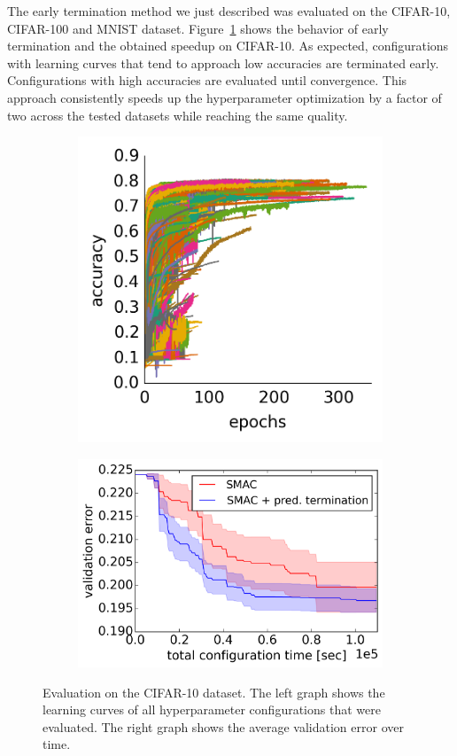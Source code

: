 The early termination method we just described was evaluated on the CIFAR-10, CIFAR-100 and MNIST dataset.
Figure~\ref{fig:earlyterm:eval} shows the behavior of early termination and the obtained speedup on CIFAR-10.
As expected, configurations with learning curves that tend to approach low accuracies are terminated early.
Configurations with high accuracies are evaluated until convergence.
This approach consistently speeds up the hyperparameter optimization by a factor of two across the tested datasets while reaching the same quality.
\begin{figure}
	\begin{subfigure}{0.4\textwidth}
		\centering
		\includegraphics[width=0.9\linewidth]{gfx/earlyterm/samples.png}
	\end{subfigure}
	\begin{subfigure}{0.6\textwidth}
		\centering
		\includegraphics[width=0.8\linewidth]{gfx/earlyterm/time.png}
	\end{subfigure}
	\caption{
		Evaluation on the CIFAR-10 dataset.
		The left graph shows the learning curves of all hyperparameter configurations that were evaluated.
		The right graph shows the average validation error over time.
	}\label{fig:earlyterm:eval}
\end{figure}
